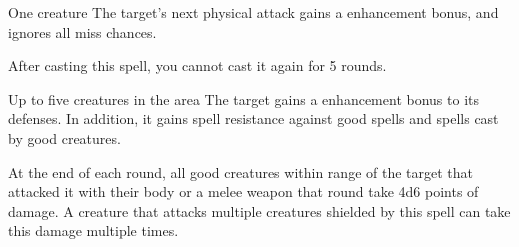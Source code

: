 \begin{spellheader}
    \spellrng{\rngmed}
\end{spellheader}
\begin{spelleffects}
    \begin{spelltarget}{One creature}
        \spelleffect The target's next physical attack gains a  enhancement bonus, and ignores all miss chances. 
    \end{spelltarget}
\end{spelleffects}
\begin{spellfooter}
    \spellnotes After casting this spell, you cannot cast it again for 5 rounds.
\end{spellfooter}

\begin{comment}
\subsubsection{U-Z}
\end{comment}

\begin{spellheader}
    \spelldur{\durshort \dismissable}
\end{spellheader}
\begin{spelleffects}
    \begin{spelltargets}{Up to five creatures in the area}
        The target gains a  enhancement bonus to its defenses. In addition, it gains spell resistance against good spells and spells cast by good creatures.
        \par At the end of each round, all good creatures within \rngclose range of the target that attacked it with their body or a melee weapon that round take 4d6 points of damage. A creature that attacks multiple creatures shielded by this spell can take this damage multiple times.
    \end{spelltargets}
    \spellline
\end{spelleffects}
\begin{spellfooter}
    
\end{spellfooter}

